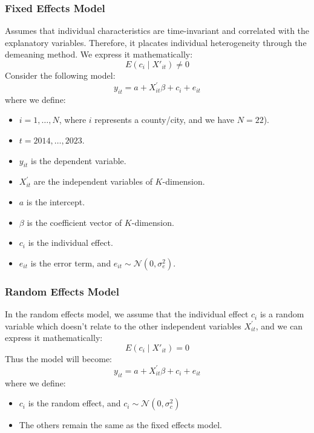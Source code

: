 \documentclass{article}
\begin{document}
\subsubsection{Fixed Effects Model} 
Assumes that individual characteristics are time-invariant and correlated with the explanatory variables. 
Therefore, it placates individual heterogeneity through the demeaning method. We express it mathematically:
\begin{equation}
    E(c_i \mid X'_{it}) \neq 0
\end{equation}
Consider the following model:
        \begin{equation}
            y_{it} = a + X^\prime_{it} \beta + c_{i} + e_{it}
        \end{equation}        
where we define:  
        \begin{itemize}
            \item \( i = 1, \dots, N \), where \( i \) represents a county/city, and we have \( N = 22 \)).
            \item \( t = 2014, \dots, 2023 \).
            \item \( y_{it} \) is the dependent variable.
            \item \( X^\prime_{it} \) are the independent variables of \( K \)-dimension.
            \item \( a \) is the intercept.
            \item \( \beta \) is the coefficient vector of \( K \)-dimension.
            \item \( c_{i} \) is the individual effect.
            \item \( e_{it} \) is the error term, and \( e_{it} \sim \mathcal{N}(0, \sigma_e^2) \).
        \end{itemize}
\subsubsection{Random Effects Model}
In the random effects model, we assume that the individual effect \( c_{i} \) is a random variable which doesn't relate to the other independent variables \( X^\prime_{it} \), and we can express it mathematically:
\begin{equation}
    E(c_i \mid X'_{it}) = 0
\end{equation}
Thus the model will become:
\begin{equation}
    y_{it} = a + X^\prime_{it} \beta + c_{i} + e_{it}
\end{equation}
where we define:  
        \begin{itemize}
            \item \( c_{i} \) is the random effect, and \( c_i \sim \mathcal{N}(0, \sigma_c^2) \)
            \item The others remain the same as the fixed effects model.
        \end{itemize}
\end{document}
